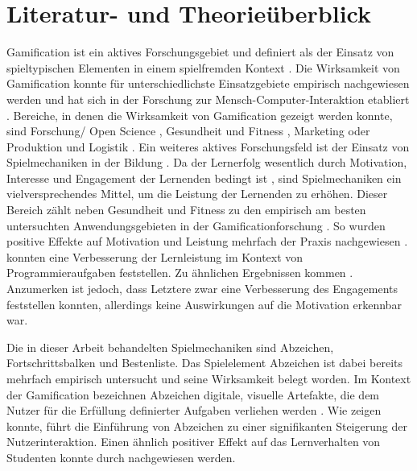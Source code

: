 \documentclass[
    a4paper,
    doc,
    12pt,
    natbib,
]{apa6}
\begin{document}
\section{Literatur- und Theorieüberblick}
Gamification ist ein aktives Forschungsgebiet und definiert als der Einsatz von spieltypischen Elementen in einem spielfremden Kontext \citep{deterding_game_2011}. 
Die Wirksamkeit von Gamification konnte für unterschiedlichste Einsatzgebiete empirisch nachgewiesen werden \citep{koivisto_rise_2019} und hat sich in der Forschung zur Mensch-Computer-Interaktion etabliert \citep{huotari_defining_2012}. 
Bereiche, in denen die Wirksamkeit von Gamification gezeigt werden konnte, sind Forschung/ Open Science \citep{brauer_erhohung_2019,kidwell_badges_2016}, Gesundheit und Fitness \citep{johnson_gamification_2016}, Marketing \citep{huotari_defining_2012} oder Produktion und Logistik \citep{warmelink_gamification_2018}.
Ein weiteres aktives Forschungsfeld ist der Einsatz von Spielmechaniken in der Bildung \citep{ibanez_gamification_2014,landers_enhancing_2017}. Da der Lernerfolg wesentlich durch Motivation, Interesse und Engagement der Lernenden bedingt ist \citep{astin_student_1984}, sind Spielmechaniken ein vielversprechendes Mittel, um die Leistung der Lernenden zu erhöhen.
Dieser Bereich zählt neben Gesundheit und Fitness zu den empirisch am besten untersuchten Anwendungsgebieten in der Gamificationforschung \citep{koivisto_rise_2019}.
So wurden positive Effekte auf Motivation und Leistung mehrfach der Praxis nachgewiesen \citep{ibanez_gamification_2014,hamzah_influence_2015,strmecki_gamification_2015}. \cite{layth_khaleel_empirical_2019} konnten eine Verbesserung der Lernleistung im Kontext von Programmieraufgaben feststellen. Zu ähnlichen Ergebnissen kommen \cite{ortiz_gamification_2017}. Anzumerken ist jedoch, dass Letztere zwar eine Verbesserung des Engagements feststellen konnten, allerdings keine Auswirkungen auf die Motivation erkennbar war.


Die in dieser Arbeit behandelten Spielmechaniken sind Abzeichen, Fortschrittsbalken und Bestenliste.
Das Spielelement Abzeichen ist dabei bereits mehrfach empirisch untersucht und seine Wirksamkeit belegt worden. Im Kontext der Gamification bezeichnen Abzeichen digitale, visuelle Artefakte, die dem Nutzer für die Erfüllung definierter Aufgaben verliehen werden \citep{antin_badges_2011}. Wie \cite{hamari_badges_2017} zeigen konnte, führt die Einführung von Abzeichen zu einer signifikanten Steigerung der Nutzerinteraktion.
Einen ähnlich positiver Effekt auf das Lernverhalten von Studenten konnte durch \cite{hamzah_influence_2015} nachgewiesen werden.
\end{document}
